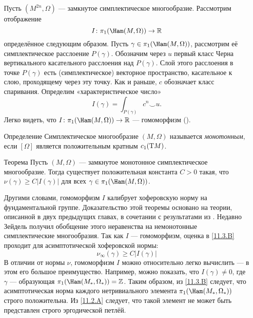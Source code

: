 Пусть $(M^{2n},\Omega)$ — замкнутое симплектическое многообразие.
Рассмотрим отображение
\[I\:\pi_1(\Ham(M,\Omega))\to\RR\]
определённое следующим образом.
Пусть $\gamma\in\pi_1(\Ham(M,\Omega))$,
рассмотрим её симплектическое расслоение $P(\gamma)$.
Обозначим через $u$ первый класс Черна вертикального касательного
расслоения над $P(\gamma)$.
Слой этого расслоения в точке $P(\gamma)$ есть (симплектическое)
векторное пространство, касательное к слою, проходящему через эту
точку. 
Как и раньше, $c$ обозначает класс спаривания.
Определим «характеристическое число» 
\[I(\gamma)= \int_{P(\gamma)} c^n\smallsmile u.\]
Легко видеть, что $I\: \pi_1(\Ham(M, \Omega))\to \RR$ — гомоморфизм
(\cite{P6,LMP2}). 

\begin{ex}{Определение}\label{11.3.A} Симплектическое многообразие
  $(M,\Omega)$ называется \emph{монотонным}, если $[\Omega]$ является 
  положительным кратным $c_1 (\mathrm{T} M)$.
\end{ex}

\begin{thm}[(\cite{P6})]{Теорема}\label{11.3.B}
Пусть $(M, \Omega)$ — замкнутое монотонное симплектическое многообразие.
Тогда существует положительная константа $C>0$ такая, что
$\nu(\gamma)\ge C|I(\gamma)|$ для всех $\gamma\z\in\pi_1(\Ham(M,\Omega))$.
\end{thm}

Другими словами, гомоморфизм $I$ калибрует хоферовскую норму на
фундаментальной группе.
Доказательство этой теоремы основано на теории, описанной в двух
предыдущих главах, в сочетании с результатами из \cite{Se}.
Недавно Зейдель получил обобщение этого неравенства на немонотонные
симплектические многообразия.
Так как $I$ — гомоморфизм, оценка в \ref{11.3.B} проходит для
асимптотической хоферовской нормы:
\[\nu_\infty(\gamma)\ge C|I(\gamma)|\]
В отличии от нормы $\nu$, гомоморфизм $I$ можно относительно легко вычислить — в этом его большое преимущество.
Например, можно показать, что $I(\gamma) \ne 0$, где $\gamma$ —
образующая $\pi_1(\Ham(M_\ast,\Omega_\ast)) = \ZZ$.
Таким образом, из \ref{11.3.B} следует, что асимптотическая норма
каждого нетривиального элемента $\pi_1(\Ham(M_\ast, \Omega_\ast))$
строго положительна.
Из \ref{11.2.A} следует, что такой элемент не может быть представлен
строго эргодической петлёй.
